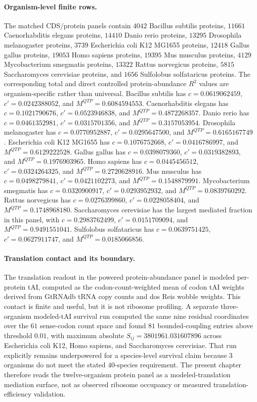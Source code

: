 \paragraph{Organism-level finite rows.}
The matched CDS/protein panels contain $4042$ Bacillus subtilis proteins, $11661$ Caenorhabditis elegans proteins, $14410$ Danio rerio proteins, $13295$ Drosophila melanogaster proteins, $3739$ Escherichia coli K12 MG1655 proteins, $12418$ Gallus gallus proteins, $19053$ Homo sapiens proteins, $19395$ Mus musculus proteins, $4129$ Mycobacterium smegmatis proteins, $13322$ Rattus norvegicus proteins, $5815$ Saccharomyces cerevisiae proteins, and $1656$ Sulfolobus solfataricus proteins.  The corresponding total and direct controlled protein-abundance $R^2$ values are organism-specific rather than universal.  Bacillus subtilis has $c=0.0619062459$, $c'=0.0242388052$, and $M^{QTP}=0.6084594553$.  Caenorhabditis elegans has $c=0.1021790676$, $c'=0.0523946838$, and $M^{QTP}=0.4872268357$.  Danio rerio has $c=0.0461352981$, $c'=0.0315701356$, and $M^{QTP}=0.3157053954$.  Drosophila melanogaster has $c=0.0770952887$, $c'=0.0295647500$, and $M^{QTP}=0.6165167749$.  Escherichia coli K12 MG1655 has $c=0.1076752668$, $c'=0.0416786997$, and $M^{QTP}=0.6129222528$.  Gallus gallus has $c=0.0398079360$, $c'=0.0319382893$, and $M^{QTP}=0.1976903965$.  Homo sapiens has $c=0.0445456512$, $c'=0.0324264325$, and $M^{QTP}=0.2720628916$.  Mus musculus has $c=0.0498279841$, $c'=0.0421102273$, and $M^{QTP}=0.1548879991$.  Mycobacterium smegmatis has $c=0.0320900917$, $c'=0.0293952932$, and $M^{QTP}=0.0839760292$.  Rattus norvegicus has $c=0.0276399860$, $c'=0.0228058404$, and $M^{QTP}=0.1748968180$.  Saccharomyces cerevisiae has the largest mediated fraction in this panel, with $c=0.2983762499$, $c'=0.0151709094$, and $M^{QTP}=0.9491551041$.  Sulfolobus solfataricus has $c=0.0639751425$, $c'=0.0627911747$, and $M^{QTP}=0.0185066856$.

\paragraph{Translation contact and its boundary.}
The translation readout in the powered protein-abundance panel is modeled per-protein tAI, computed as the codon-count-weighted mean of codon tAI weights derived from GtRNAdb tRNA copy counts and dos Reis wobble weights.  This contact is finite and useful, but it is not ribosome profiling.  A separate three-organism modeled-tAI survival run computed the same nine residual coordinates over the $61$ sense-codon count space and found $81$ bounded-coupling entries above threshold $0.01$, with maximum absolute $S_{ij}=3801961.031607896$ across Escherichia coli K12, Homo sapiens, and Saccharomyces cerevisiae.  That run explicitly remains underpowered for a species-level survival claim because $3$ organisms do not meet the stated $40$-species requirement.  The present chapter therefore reads the twelve-organism protein panel as a modeled-translation mediation surface, not as observed ribosome occupancy or measured translation-efficiency validation.

